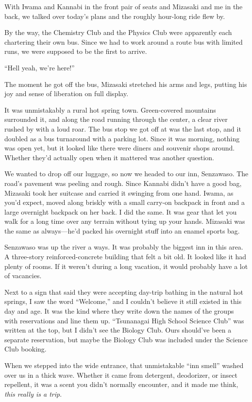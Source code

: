 \documentclass[
    a4paper,
    12pt,
    twoside,
    openany,
    UTF8,
    fontset=windows
]{ctexbook}
\begin{document}
With Iwama and Kannabi in the front pair of seats and Mizasaki and me in the back, we talked over today's plans and the roughly hour-long ride flew by.

By the way, the Chemistry Club and the Physics Club were apparently each chartering their own bus. Since we had to work around a route bus with limited runs, we were supposed to be the first to arrive.

``Hell yeah, we're here!''

The moment he got off the bus, Mizasaki stretched his arms and legs, putting his joy and sense of liberation on full display.

It was unmistakably a rural hot spring town. Green-covered mountains surrounded it, and along the road running through the center, a clear river rushed by with a loud roar. The bus stop we got off at was the last stop, and it doubled as a bus turnaround with a parking lot. Since it was morning, nothing was open yet, but it looked like there were diners and souvenir shops around. Whether they'd actually open when it mattered was another question.

We wanted to drop off our luggage, so now we headed to our inn, Senzawaso. The road's pavement was peeling and rough. Since Kannabi didn't have a good bag, Mizasaki took her suitcase and carried it swinging from one hand. Iwama, as you'd expect, moved along briskly with a small carry-on backpack in front and a large overnight backpack on her back. I did the same. It was gear that let you walk for a long time over any terrain without tying up your hands. Mizasaki was the same as always---he'd packed his overnight stuff into an enamel sports bag.

Senzawaso was up the river a ways. It was probably the biggest inn in this area. A three-story reinforced-concrete building that felt a bit old. It looked like it had plenty of rooms. If it weren't during a long vacation, it would probably have a lot of vacancies.

Next to a sign that said they were accepting day-trip bathing in the natural hot springs, I saw the word ``Welcome,'' and I couldn't believe it still existed in this day and age. It was the kind where they write down the names of the groups with reservations and line them up. ``Tsunanagai High School Science Club'' was written at the top, but I didn't see the Biology Club. Ours should've been a separate reservation, but maybe the Biology Club was included under the Science Club booking.

When we stepped into the wide entrance, that unmistakable ``inn smell'' washed over us in a thick wave. Whether it came from detergent, deodorizer, or insect repellent, it was a scent you didn't normally encounter, and it made me think, \textit{this really is a trip}.
\end{document}
